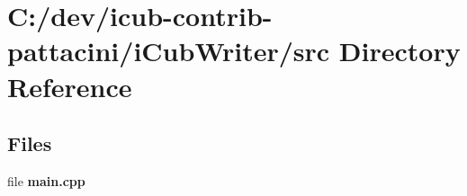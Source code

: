 \section{C\+:/dev/icub-\/contrib-\/pattacini/i\+Cub\+Writer/src Directory Reference}
\label{dir_f1ef2ffd0c7783f972704006ec9d595c}
\subsection*{Files}
\begin{DoxyCompactItemize}
\item 
file {\bfseries main.\+cpp}
\end{DoxyCompactItemize}
